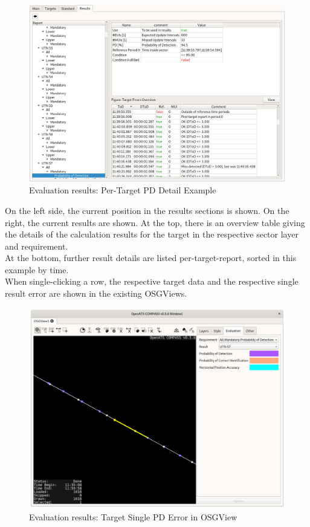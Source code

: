 \begin{figure}[H]
  \hspace*{-2cm}
    \includegraphics[width=18cm,frame]{../screenshots/eval_results_target_det_example.png}
  \caption{Evaluation results: Per-Target PD Detail Example}
\end{figure}

On the left side, the current position in the results sections is shown. On the right, the current results are shown. At the top, there is an overview table giving the details of the calculation results for the target in the respective sector layer and requirement. \\

At the bottom, further result details are listed per-target-report, sorted in this example by time. \\

When single-clicking a row, the respective target data and the respective single result error are shown in the existing OSGViews.

\begin{figure}[H]
  \hspace*{-2.5cm}
    \includegraphics[width=19cm]{../screenshots/eval_results_pd_single_tr_osgview.png}
  \caption{Evaluation results: Target Single PD Error in OSGView}
\end{figure}


